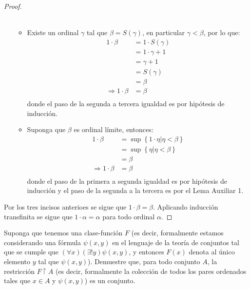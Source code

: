 \documentclass[12pt]{article}
\newcounter{it}
\theoremstyle{largebreak}
\begin{document}
\begin{proof}
\begin{itemize}
\begin{itemize}
\begin{equation*}
\begin{split}
                    \end{split}
                \end{equation*}
                \item Existe un ordinal $\gamma$ tal que $\beta=S(\gamma)$, en particular $\gamma<\beta$, por lo que:
                \begin{equation*}
                    \begin{split}
                        1\cdot\beta&=1\cdot S(\gamma)\\
                        &=1\cdot\gamma+1\\
                        &=\gamma+1\\
                        &=S(\gamma)\\
                        &=\beta\\
                        \Rightarrow 1\cdot\beta&=\beta\\
                    \end{split}
                \end{equation*}
                donde el paso de la segunda a tercera igualdad es por hipótesis de inducción.
                \item Suponga que $\beta$ es ordinal límite, entonces:
                \begin{equation*}
                    \begin{split}
                        1\cdot\beta&=\sup\left\{1\cdot\eta\Big|\eta<\beta \right\}\\
                        &=\sup\left\{\eta\Big|\eta<\beta \right\}\\
                        &=\beta\\
                        \Rightarrow 1\cdot\beta&=\beta\\
                    \end{split}
                \end{equation*}
                donde el paso de la primera a segunda igualdad es por hipótesis de inducción y el paso de la segunda a la tercera es por el Lema Auxiliar 1.
            \end{itemize}
        \end{itemize}
        Por los tres incisos anterioes se sigue que $1\cdot\beta=\beta$. Aplicando inducción transfinita se sigue que $1\cdot\alpha=\alpha$ para todo ordinal $\alpha$.
    \end{proof}

    \begin{excer}
        Suponga que tenemos una clase-función $F$ (es decir, formalmente estamos considerando una fórmula $\psi(x,y)$ en el lenguaje de la teoría de conjuntos tal que se cumple que $(\forall x)(\exists!y)\psi(x,y)$, y entonces $F(x)$ denota al único elemento $y$ tal que $\psi(x,y)$). Demuestre que, para todo conjunto $A$, la restricción $F\upharpoonright A$ (es decir, formalmente la colección de todos los pares ordenados tales que $x\in A$ y $\psi(x,y)$) es un conjunto.
    \end{excer}
\end{document}
